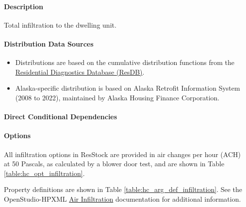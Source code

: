 \paragraph{Description}
% 
Total infiltration to the dwelling unit.

\paragraph{Distribution Data Sources}
% 
\begin{itemize}

\item
  Distributions are based on the cumulative distribution functions from
  the \href{http://resdb.lbl.gov/}{Residential Diagnostics Database (ResDB)}.
\item
  Alaska-specific distribution is based on Alaska Retrofit Information
  System (2008 to 2022), maintained by Alaska Housing Finance
  Corporation.
\end{itemize}

\paragraph{Direct Conditional Dependencies}


\paragraph{Options}
All infiltration options in ResStock are provided in air changes per hour (ACH) at 50 Pascals, as calculated by a blower door test, and are shown in Table \ref{table:hc_opt_infiltration}.



Property definitions are shown in Table \ref{table:hc_arg_def_infiltration}. See the OpenStudio-HPXML \href{https://openstudio-hpxml.readthedocs.io/en/v1.10.0/workflow_inputs.html##hpxml-air-infiltration}{Air Infiltration} documentation for additional information.



